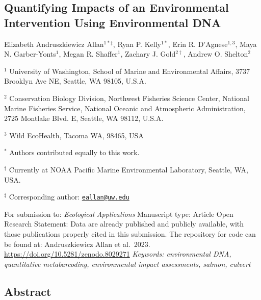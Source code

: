 \documentclass[
]{article}
\author{}
\date{\vspace{-2.5em}}
\begin{document}
\hypertarget{quantifying-impacts-of-an-environmental-intervention-using-environmental-dna}{%
\subsection{Quantifying Impacts of an Environmental Intervention Using
Environmental
DNA}\label{quantifying-impacts-of-an-environmental-intervention-using-environmental-dna}}

Elizabeth Andruszkiewicz Allan\(^{1*\ddagger}\), Ryan P. Kelly\(^{1*}\),
Erin R. D'Agnese\(^{1,3}\), Maya N. Garber-Yonts\(^{1}\), Megan R.
Shaffer\(^{1}\), Zachary J. Gold\(^{2\dagger}\), Andrew O.
Shelton\(^{2}\)

\(^{1}\) University of Washington, School of Marine and Environmental
Affairs, 3737 Brooklyn Ave NE, Seattle, WA 98105, U.S.A.

\(^2\) Conservation Biology Division, Northwest Fisheries Science
Center, National Marine Fisheries Service, National Oceanic and
Atmospheric Administration, 2725 Montlake Blvd. E, Seattle, WA 98112,
U.S.A.

\(^3\) Wild EcoHealth, Tacoma WA, 98465, USA

\vspace{1em}

\(^{*}\) Authors contributed equally to this work.

\(^{\dagger}\) Currently at NOAA Pacific Marine Environmental
Laboratory, Seattle, WA, USA.

\(^{\ddagger}\) Corresponding author:
\href{mailto:eallan@uw.edu}{\nolinkurl{eallan@uw.edu}} \vspace{1em}

For submission to: \textit{Ecological Applications} \newline Manuscript
type: Article \newline Open Research Statement: Data are already
published and publicly available, with those publications properly cited
in this submission. The repository for code can be found at:
\newline Andruszkiewicz Allan et al.~2023.
\url{https://doi.org/10.5281/zenodo.8029271}
\newline \textit{Keywords: environmental DNA, quantitative metabarcoding, environmental impact assessments, salmon, culvert}

\newpage

\hypertarget{abstract}{%
\subsection{Abstract}\label{abstract}}
\end{document}
